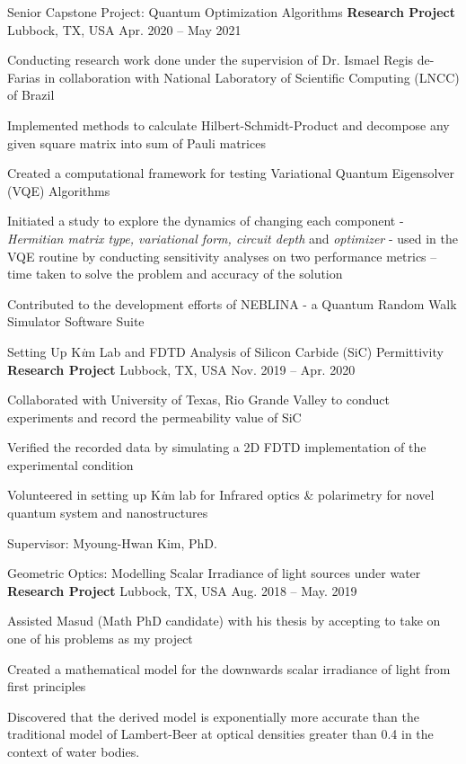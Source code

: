 
\begin{cventries}

  \cventry
  {Senior Capstone Project: Quantum Optimization Algorithms}
  {\textbf{Research Project}}
    {Lubbock, TX, USA}
    {Apr. 2020 -- May 2021}
    {
      \begin{cvitems}
        \item{Conducting research work done under the supervision of Dr. Ismael Regis de-Farias in collaboration with National Laboratory of Scientific Computing (LNCC) of Brazil}
        \item{Implemented methods to calculate Hilbert-Schmidt-Product and decompose any given square matrix into sum of Pauli matrices}
        \item{Created a computational framework for testing Variational Quantum Eigensolver (VQE) Algorithms}
        \item{Initiated a study to explore the dynamics of changing each component - \textit{Hermitian matrix type, variational form, circuit depth} and \textit{optimizer} - used in the VQE routine by conducting sensitivity analyses on two performance metrics – time taken to solve the problem and accuracy of the solution}
        \item{Contributed to the development efforts of NEBLINA - a Quantum Random Walk Simulator Software Suite}
      \end{cvitems}
    }

  \cventry
  {Setting Up K\textit{i}m Lab and FDTD Analysis of Silicon Carbide (SiC) Permittivity}
  {\textbf{Research Project}}
    {Lubbock, TX, USA}
    {Nov. 2019 -- Apr. 2020}
    {
      \begin{cvitems}
      \item{Collaborated with University of Texas, Rio Grande Valley to conduct experiments and record the permeability value of SiC}
      \item{Verified the recorded data by simulating a 2D FDTD implementation of the experimental condition}
      \item{Volunteered in setting up K\textit{i}m lab for Infrared optics \& polarimetry for novel quantum system and nanostructures}
      \item{Supervisor: Myoung-Hwan Kim, PhD.}
      \end{cvitems}
    }

  \cventry
  {Geometric Optics: Modelling Scalar Irradiance of light sources under water}
  {\textbf{Research Project}}
    {Lubbock, TX, USA}
    {Aug. 2018 -- May. 2019}
    {
      \begin{cvitems}
      \item{Assisted Masud (Math PhD candidate) with his thesis by accepting to take on one of his problems as my project}
  \item{Created a mathematical model for the downwards scalar irradiance of light from ﬁrst principles}
  \item{Discovered that the derived model is exponentially more accurate than the traditional model of Lambert-Beer at optical densities greater than 0.4 in the context of water bodies.}
      \end{cvitems}
    }


\end{cventries}
